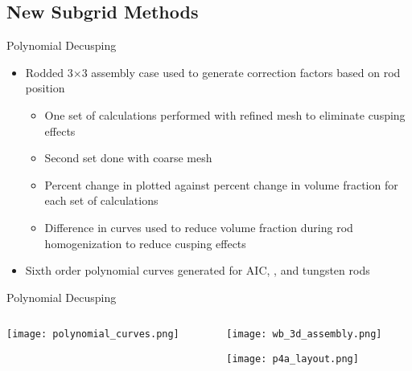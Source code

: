 \subsection{New Subgrid Methods}
\begin{frame}[t]{Polynomial Decusping}

\begin{itemize}
    \item Rodded 3$\times$3 assembly case used to generate correction factors based on rod position
    \begin{itemize}
        \item One set of calculations performed with refined mesh to eliminate cusping effects
        \item Second set done with coarse mesh
        \item Percent change in \keff{} plotted against percent change in volume fraction for each set of calculations
        \item Difference in curves used to reduce volume fraction during rod homogenization to reduce cusping effects
    \end{itemize}
    \item Sixth order polynomial curves generated for AIC, \bfc{}, and tungsten rods
\end{itemize}

\end{frame}


\begin{frame}[t]{Polynomial Decusping}
    
\begin{columns}
\begin{column}{0.8\textwidth}
\begin{center}
    \texttt{[image: polynomial\_curves.png]}
\end{center}
\vfill
\end{column}
\begin{column}{0.2\textwidth}
\begin{center}
\texttt{[image: wb\_3d\_assembly.png]}

\texttt{[image: p4a\_layout.png]}
\end{center}
\vfill
\end{column}
\end{columns}
    
\end{frame}

